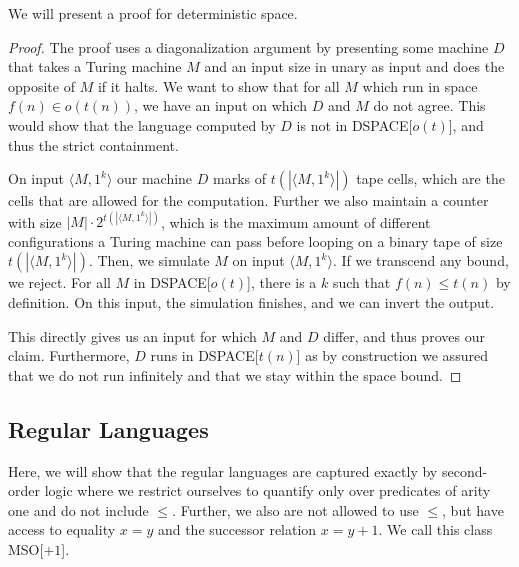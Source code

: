 We will present a proof for deterministic space.
\begin{proof}
    The proof uses a diagonalization argument by presenting some machine $D$ that takes a Turing machine $M$ and an input size in unary as input and does the opposite of $M$ if it halts.
    We want to show that for all $M$ which run in space $f(n) \in o(t(n))$, we have an input on which $D$ and $M$ do not agree.
    This would show that the language computed by $D$ is not in \acs{DSPACE}[$o(t)$], and thus the strict containment.

    On input $\langle M, 1^{k} \rangle$ our machine $D$ marks of $t(|\langle M, 1^{k} \rangle|)$ tape cells, which are the cells that are allowed for the computation.
    Further we also maintain a counter with size $|M|\cdot 2^{t(|\langle M, 1^{k} \rangle|)}$, which is the maximum amount of different configurations a Turing machine can pass before looping on a binary tape of size $t(|\langle M, 1^{k} \rangle|)$.
    Then, we simulate $M$ on input $\langle M, 1^{k} \rangle$.
    If we transcend any bound, we reject.
    For all $M$ in \acs{DSPACE}[$o(t)$], there is a $k$ such that $f(n) \leq t(n)$ by definition.
    On this input, the simulation finishes, and we can invert the output.

    This directly gives us an input for which $M$ and $D$ differ, and thus proves our claim.
    Furthermore, $D$ runs in \acs{DSPACE}[$t(n)$] as by construction we assured that we do not run infinitely and that we stay within the space bound.
\end{proof}



\subsection{Regular Languages}\label{subsec:des-regular-languages}

Here, we will show that the regular languages are captured exactly by second-order logic where we restrict ourselves to quantify only over predicates of arity one and do not include $\leq$.
Further, we also are not allowed to use $\leq$, but have access to equality $x = y$ and the successor relation $x = y + 1$.
We call this class \acs{MSO}[$+1$].

